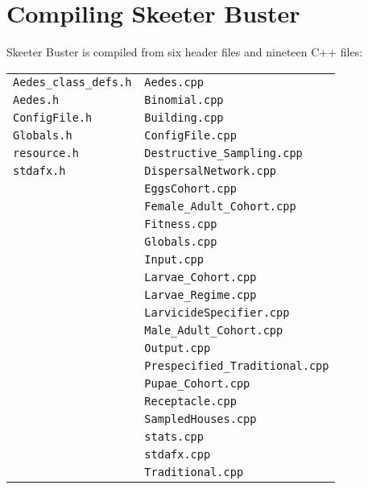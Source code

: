 \documentclass[11pt]{article}
\newcommand{\linecmd}[1]{\texttt{#1}}
\begin{document}
\newpage{}\section{Compiling Skeeter Buster}

Skeeter Buster is compiled from six header files and nineteen C++ files:

\begin{table}[ht]
\begin{center}
\begin{tabular}{ll}

\linecmd{Aedes\_class\_defs.h} & \linecmd{Aedes.cpp}\\
\linecmd{Aedes.h} & 	\linecmd{Binomial.cpp}\\
\linecmd{ConfigFile.h} & \linecmd{Building.cpp}\\
\linecmd{Globals.h} & \linecmd{ConfigFile.cpp}\\
\linecmd{resource.h} & \linecmd{Destructive\_Sampling.cpp}\\
\linecmd{stdafx.h} & \linecmd{DispersalNetwork.cpp}\\
 & \linecmd{EggsCohort.cpp}\\
 & \linecmd{Female\_Adult\_Cohort.cpp}\\
 & \linecmd{Fitness.cpp}\\
 & \linecmd{Globals.cpp}\\
 & \linecmd{Input.cpp}\\
 & \linecmd{Larvae\_Cohort.cpp}\\
  & \linecmd{Larvae\_Regime.cpp}\\
  & \linecmd{LarvicideSpecifier.cpp}\\
 & \linecmd{Male\_Adult\_Cohort.cpp}\\
 & \linecmd{Output.cpp}\\
  & \linecmd{Prespecified\_Traditional.cpp}\\
 & \linecmd{Pupae\_Cohort.cpp}\\
 & \linecmd{Receptacle.cpp}\\
 & \linecmd{SampledHouses.cpp}\\
 & \linecmd{stats.cpp}\\
  & \linecmd{stdafx.cpp}\\
 & \linecmd{Traditional.cpp}\\
	 
\end{tabular}
\end{center}
\label{default}
\end{table}
\end{document}
